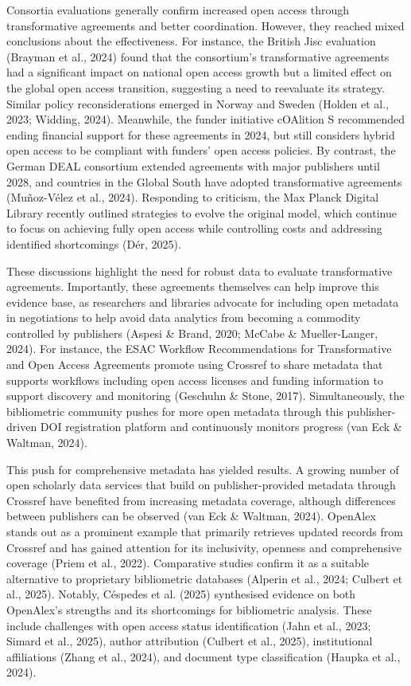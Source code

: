 \documentclass[a4paper,man,floatsintext,longtable,noextraspace,10pt]{apa6}
\begin{document}
Consortia evaluations generally confirm increased open access through
transformative agreements and better coordination. However, they reached
mixed conclusions about the effectiveness. For instance, the British
Jisc evaluation (Brayman et al., 2024) found that the consortium's
transformative agreements had a significant impact on national open
access growth but a limited effect on the global open access transition,
suggesting a need to reevaluate its strategy. Similar policy
reconsiderations emerged in Norway and Sweden (Holden et al., 2023;
Widding, 2024). Meanwhile, the funder initiative cOAlition S recommended
ending financial support for these agreements in 2024, but still
considers hybrid open access to be compliant with funders' open access
policies. By contrast, the German DEAL consortium extended agreements
with major publishers until 2028, and countries in the Global South have
adopted transformative agreements (Muñoz-Vélez et al., 2024). Responding
to criticism, the Max Planck Digital Library recently outlined
strategies to evolve the original model, which continue to focus on
achieving fully open access while controlling costs and addressing
identified shortcomings (Dér, 2025).

These discussions highlight the need for robust data to evaluate
transformative agreements. Importantly, these agreements themselves can
help improve this evidence base, as researchers and libraries advocate
for including open metadata in negotiations to help avoid data analytics
from becoming a commodity controlled by publishers (Aspesi \& Brand,
2020; McCabe \& Mueller-Langer, 2024). For instance, the ESAC Workflow
Recommendations for Transformative and Open Access Agreements promote
using Crossref to share metadata that supports workflows including open
access licenses and funding information to support discovery and
monitoring (Geschuhn \& Stone, 2017). Simultaneously, the bibliometric
community pushes for more open metadata through this publisher-driven
DOI registration platform and continuously monitors progress (van Eck \&
Waltman, 2024).

This push for comprehensive metadata has yielded results. A growing
number of open scholarly data services that build on publisher-provided
metadata through Crossref have benefited from increasing metadata
coverage, although differences between publishers can be observed (van
Eck \& Waltman, 2024). OpenAlex stands out as a prominent example that
primarily retrieves updated records from Crossref and has gained
attention for its inclusivity, openness and comprehensive coverage
(Priem et al., 2022). Comparative studies confirm it as a suitable
alternative to proprietary bibliometric databases (Alperin et al., 2024;
Culbert et al., 2025). Notably, Céspedes et al. (2025) synthesised
evidence on both OpenAlex's strengths and its shortcomings for
bibliometric analysis. These include challenges with open access status
identification (Jahn et al., 2023; Simard et al., 2025), author
attribution (Culbert et al., 2025), institutional affiliations (Zhang et
al., 2024), and document type classification (Haupka et al., 2024).
\end{document}
